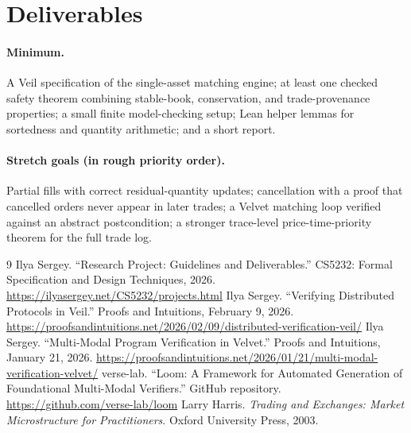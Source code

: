 \documentclass[11pt]{article}
\begin{document}
\section{Deliverables}

\paragraph{Minimum.} A Veil specification of the single-asset matching engine;
at least one checked safety theorem combining stable-book, conservation, and
trade-provenance properties; a small finite model-checking setup; Lean helper
lemmas for sortedness and quantity arithmetic; and a short report.

\paragraph{Stretch goals (in rough priority order).}
Partial fills with correct residual-quantity updates;
cancellation with a proof that cancelled orders never appear in later trades;
a Velvet matching loop verified against an abstract postcondition;
a stronger trace-level price-time-priority theorem for the full trade log.


\begin{thebibliography}{9}
 Ilya Sergey. ``Research Project: Guidelines and Deliverables.'' CS5232: Formal Specification and Design Techniques, 2026. \url{https://ilyasergey.net/CS5232/projects.html}
 Ilya Sergey. ``Verifying Distributed Protocols in Veil.'' Proofs and Intuitions, February 9, 2026. \url{https://proofsandintuitions.net/2026/02/09/distributed-verification-veil/}
 Ilya Sergey. ``Multi-Modal Program Verification in Velvet.'' Proofs and Intuitions, January 21, 2026. \url{https://proofsandintuitions.net/2026/01/21/multi-modal-verification-velvet/}
 verse-lab. ``Loom: A Framework for Automated Generation of Foundational Multi-Modal Verifiers.'' GitHub repository. \url{https://github.com/verse-lab/loom}
 Larry Harris. \emph{Trading and Exchanges: Market Microstructure for Practitioners}. Oxford University Press, 2003.
\end{thebibliography}
\end{document}
